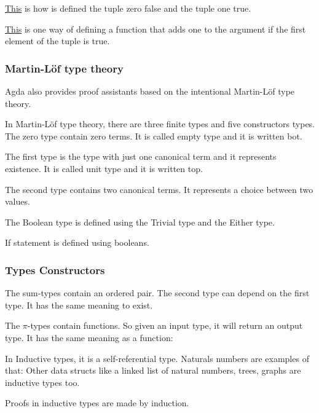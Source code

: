   \hyperref[tupleexamples]{This} is how is defined the tuple zero false and the tuple one true.

  \hyperref[tupleadd]{This} is one way of defining a function that adds one to the argument
  if the first element of the tuple is true.


  \subsubsection{Martin-Löf type theory}
  Agda also provides proof assistants based on the intentional Martin-Löf type theory.

    In Martin-Löf type theory, there are three finite types and five constructors types.
    The zero type contain zero terms. It is called empty type and it is written bot.

    The first type is the type with just one canonical term and it represents existence.
    It is called unit type and it is written top.

    The second type contains two canonical terms. It represents a choice between two values.

    The Boolean type is defined using the Trivial type and the Either type.

    If statement is defined using booleans.


    \subsubsection{Types Constructors}
    The sum-types contain an ordered pair.
    The second type can depend on the first type.
    It has the same meaning to exist.

    The $\pi$-types contain functions.
    So given an input type, it will return an output type.
    It has the same meaning as a function:

    In Inductive types, it is a self-referential type.
    Naturals numbers are examples of that:
    Other data structs like a linked list of natural numbers, trees, graphs are inductive types too.

    Proofs in inductive types are made by induction.

